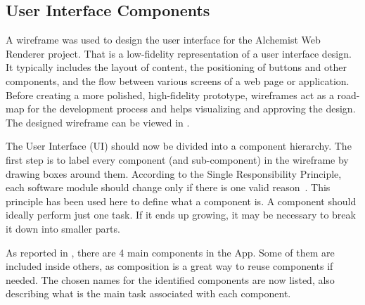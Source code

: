\subsection{User Interface Components}
\label{ssec:user-interface-components}

A wireframe was used to design the user interface for the Alchemist Web Renderer project. That is a low-fidelity representation of a user interface design. It typically includes the layout of content, the positioning of buttons and other components, and the flow between various screens of a web page or application. Before creating a more polished, high-fidelity prototype, wireframes act as a road-map for the development process and helps visualizing and approving the design. The designed wireframe can be viewed in .\newline


The User Interface (UI) should now be divided into a component hierarchy. The first step is to label every component (and sub-component) in the wireframe by drawing boxes around them.
According to the Single Responsibility Principle, each software module should change only if there is one valid reason~\cite{CleanCod98:online}. This principle has been used here to define what a component is. A component should ideally perform just one task. If it ends up growing, it may be necessary to break it down into smaller parts.


As reported in , there are 4 main components in the App. Some of them are included inside others, as composition is a great way to reuse components if needed. The chosen names for the identified components are now listed, also describing what is the main task associated with each component.

